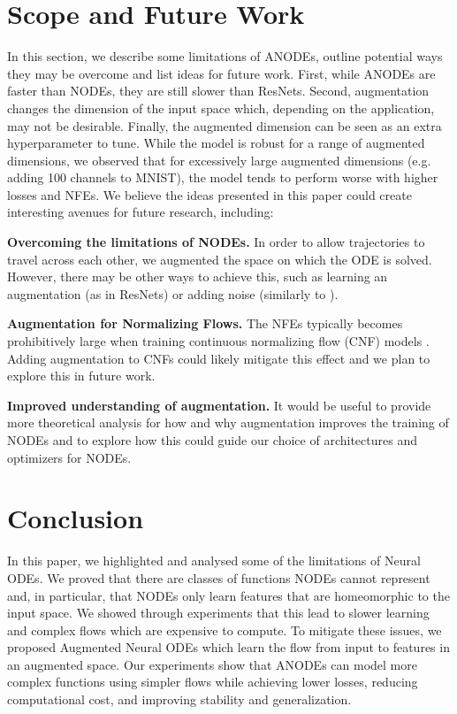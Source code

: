 \documentclass{article}
\begin{document}
\section{Scope and Future Work}

In this section, we describe some limitations of ANODEs, outline potential ways they may be overcome and list ideas for future work. First, while ANODEs are faster than NODEs, they are still slower than ResNets. Second, augmentation changes the dimension of the input space which, depending on the application, may not be desirable. Finally, the augmented dimension can be seen as an extra hyperparameter to tune. While the model is robust for a range of augmented dimensions, we observed that for excessively large augmented dimensions (e.g. adding 100 channels to MNIST), the model tends to perform worse with higher losses and NFEs. We believe the ideas presented in this paper could create interesting avenues for future research, including:


\textbf{Overcoming the limitations of NODEs.} In order to allow trajectories to travel across each other, we augmented the space on which the ODE is solved. However, there may be other ways to achieve this, such as learning an augmentation (as in ResNets) or adding noise (similarly to \cite{wang2018enresnet}).

\textbf{Augmentation for Normalizing Flows.} The NFEs typically becomes prohibitively large when training continuous normalizing flow (CNF) models \citep{grathwohl2018ffjord}. Adding augmentation to CNFs could likely mitigate this effect and we plan to explore this in future work.

\textbf{Improved understanding of augmentation.} It would be useful to provide more theoretical analysis for how and why augmentation improves the training of NODEs and to explore how this could guide our choice of architectures and optimizers for NODEs. 

\section{Conclusion}
In this paper, we highlighted and analysed some of the limitations of Neural ODEs. We proved that there are classes of functions NODEs cannot represent and, in particular, that NODEs only learn features that are homeomorphic to the input space. We showed through experiments that this lead to slower learning and complex flows which are expensive to compute. To mitigate these issues, we proposed Augmented Neural ODEs which learn the flow from input to features in an augmented space. Our experiments show that ANODEs can model more complex functions using simpler flows while achieving lower losses, reducing computational cost, and improving stability and generalization. 
\end{document}
